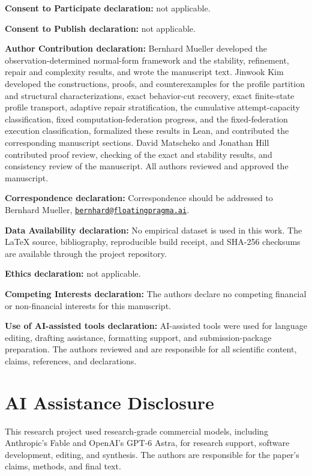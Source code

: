 \documentclass[11pt]{article}
\theoremstyle{definition}
\theoremstyle{remark}
\numberwithin{equation}{section}
\begin{document}
\noindent\textbf{Consent to Participate declaration:} not applicable.

\noindent\textbf{Consent to Publish declaration:} not applicable.

\noindent\textbf{Author Contribution declaration:} Bernhard Mueller developed the
observation-determined normal-form framework and the stability, refinement, repair and complexity
results, and wrote the manuscript text. Jinwook Kim developed the constructions, proofs, and
counterexamples for the profile partition and structural characterizations, exact
behavior-cut recovery, exact finite-state profile transport, adaptive repair
stratification, the cumulative attempt-capacity classification, fixed
computation-federation progress, and the fixed-federation execution classification,
formalized these results in Lean, and contributed the corresponding manuscript
sections. David Matscheko and Jonathan Hill contributed
proof review, checking of the exact and stability results, and consistency
review of the manuscript. All authors reviewed and approved the manuscript.

\noindent\textbf{Correspondence declaration:} Correspondence should be addressed to Bernhard
Mueller, \href{mailto:bernhard@floatingpragma.ai}{\nolinkurl{bernhard@floatingpragma.ai}}.

\noindent\textbf{Data Availability declaration:} No empirical dataset is used in this work. The
LaTeX source, bibliography, reproducible build receipt, and SHA-256 checksums
are available through the project repository.

\noindent\textbf{Ethics declaration:} not applicable.

\noindent\textbf{Competing Interests declaration:} The authors declare no competing financial or
non-financial interests for this manuscript.

\noindent\textbf{Use of AI-assisted tools declaration:} AI-assisted tools were used for language
editing, drafting assistance, formatting support, and submission-package preparation. The authors
reviewed and are responsible for all scientific content, claims, references, and declarations.




\section*{AI Assistance Disclosure}
This research project used research-grade commercial models, including
Anthropic's Fable and OpenAI's GPT-6 Astra, for research support, software
development, editing, and synthesis. The authors are responsible for the
paper's claims, methods, and final text.
\end{document}

